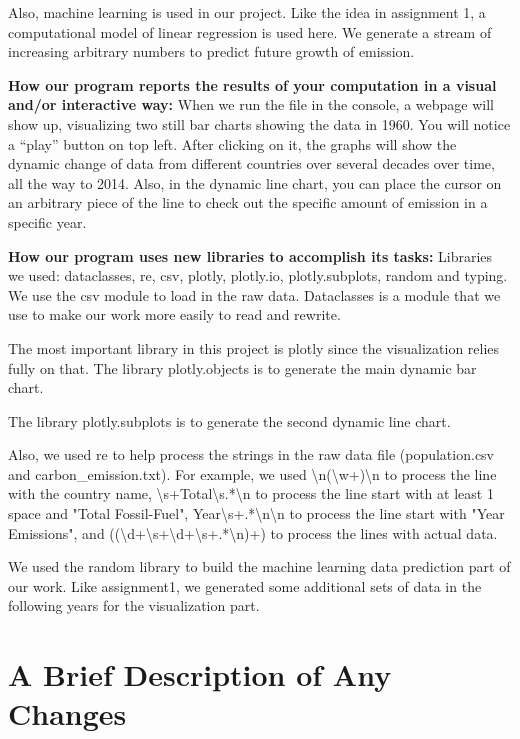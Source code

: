 \documentclass[fontsize=11pt]{article}
\begin{document}
    Also, machine learning is used in our project. Like the idea in assignment 1, a computational model of linear regression is used here. We generate a stream of increasing arbitrary numbers to predict future growth of emission.

    \textbf{How our program reports the results of your computation in a visual and/or interactive way:}
    When we run the file in the console, a webpage will show up, visualizing two still bar charts showing the data in 1960. You will notice a “play” button on top left. After clicking on it, the graphs will show the dynamic change of data from different countries over several decades over time, all the way to 2014. Also, in the dynamic line chart, you can place the cursor on an arbitrary piece of the line to check out the specific amount of emission in a specific year.

    \textbf{How our program uses new libraries to accomplish its tasks:}
Libraries we used: dataclasses, re, csv, plotly, plotly.io, plotly.subplots, random and typing.
We use the csv module to load in the raw data.
Dataclasses is a module that we use to make our work more easily to read and rewrite.

The most important library in this project is plotly since the visualization relies fully on that. The library plotly.objects is to generate the main dynamic bar chart.

The library plotly.subplots is to generate the second dynamic line chart.

Also, we used re to help process the strings in the raw data file (population.csv and carbon\_emission.txt). For example, we used \textbackslash n(\textbackslash w+)\textbackslash n to process the line with the country name, \textbackslash s+Total\textbackslash s.*\textbackslash n to process the line start with at least 1 space and "Total Fossil-Fuel", Year\textbackslash s+.*\textbackslash n\textbackslash n to process the line start with "Year Emissions", and ((\textbackslash d+\textbackslash s+\textbackslash d+\textbackslash s+.*\textbackslash n)+) to process the lines with actual data.

We used the random library to build the machine learning data prediction part of our work. Like assignment1, we generated some additional sets of data in the following years for the visualization part.

\section*{A Brief Description of Any Changes} \indent
\end{document}
